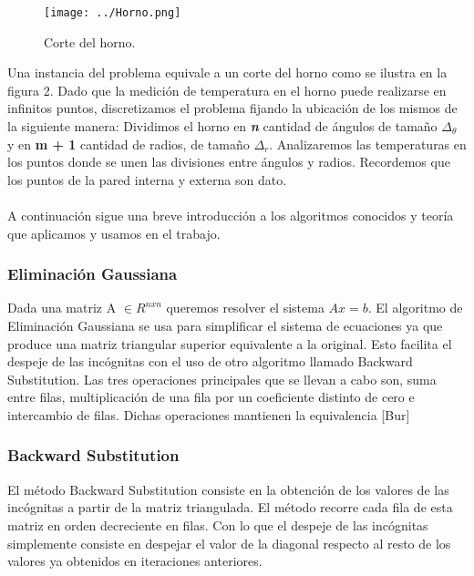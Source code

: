 \begin{wrapfigure}{r}{0.5\textwidth}
  \vspace{-20pt}
  \begin{center}
    \texttt{[image: ../Horno.png]}
  \end{center}
  \vspace{-20pt}
  \caption{Corte del horno.}
  \vspace{-10pt}
  \label{fig:corteHorno}
\end{wrapfigure}


Una instancia del problema equivale a un corte del horno como se ilustra en la figura 2. Dado que la medición de temperatura en el horno puede realizarse en infinitos puntos, discretizamos el problema fijando la ubicación de los mismos de la siguiente manera: Dividimos el horno en \textbf{\textit{n}} cantidad de ángulos de tamaño $\Delta_{\theta}$ y en \textbf{m + 1} cantidad de radios, de tamaño $\Delta_{r}$. Analizaremos las temperaturas en los puntos donde se unen las divisiones entre ángulos y radios. Recordemos que los puntos de la pared interna y externa son dato.\\
\\






A continuación sigue una breve introducción a los algoritmos conocidos y teoría que aplicamos y usamos en el trabajo.

\subsubsection{Eliminación Gaussiana}
Dada una matriz A $\in R^{nxn}$ queremos resolver el sistema $Ax = b$. El algoritmo de Eliminación Gaussiana se usa para simplificar el sistema de ecuaciones ya que produce una matriz triangular superior equivalente a la original. Esto facilita el despeje de las incógnitas con el uso de otro algoritmo llamado Backward Substitution. Las tres operaciones principales que se llevan a cabo son, suma entre filas, multiplicación de una fila por un coeficiente distinto de cero e intercambio de filas. Dichas operaciones mantienen la equivalencia [Bur]

\subsubsection{Backward Substitution}
El método Backward Substitution consiste en la obtención de los valores de las incógnitas a partir de la matriz triangulada. El método recorre cada fila de esta matriz en orden decreciente en filas. Con lo que el despeje de las incógnitas simplemente consiste en despejar el valor de la diagonal respecto al resto de los valores ya obtenidos en iteraciones anteriores.

